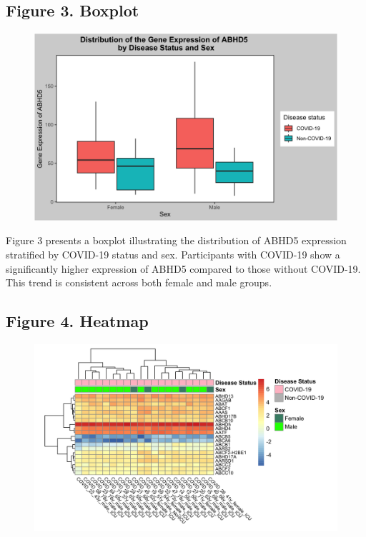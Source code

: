 \documentclass{article}
\begin{document}
\subsection{Figure 3. Boxplot}
\begin{figure}[H]
    \centering
    \includegraphics[width=1\linewidth]{Boxplot.png}
    \label{fig:placeholder}
\end{figure}

Figure 3 presents a boxplot illustrating the distribution of ABHD5 expression stratified by COVID-19 status and sex. Participants with COVID-19 show a significantly higher expression of ABHD5 compared to those without COVID-19. This trend is consistent across both female and male groups.

\subsection{Figure 4. Heatmap}
\begin{figure}[H]
    \centering
    \includegraphics[width=1\linewidth]{Heatmap.png}
    \label{fig:placeholder}
\end{figure}
\end{document}
